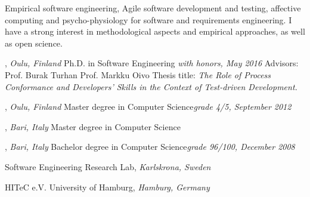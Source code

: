 \documentclass[9pt]{article}
\begin{document}
\textheight=580pt

\noindent Empirical software engineering, Agile software development and testing, affective computing and psycho-physiology for software and requirements engineering. I have a strong interest in methodological aspects and empirical approaches, as well as open science.
\bigskip
\medskip



, \emph{Oulu, Finland} \vspace{0.01in} 
\newline Ph.D. in Software Engineering {\em with honors, May 2016}
\newline Advisors: Prof. Burak Turhan \amper{} Prof. Markku Oivo
\newline Thesis title: {\em The Role of Process Conformance and Developers' Skills in the Context of Test-driven Development.}

\bigskip


, \emph{Oulu, Finland} \vspace{0.01in}  
\newline\noindent Master degree in Computer Science{\em grade 4/5, September 2012}

\bigskip

, \emph{Bari, Italy} \vspace{0.01in}  
\newline\noindent Master degree in Computer Science


\bigskip

, \emph{Bari, Italy} \vspace{0.01in}  
\newline\noindent Bachelor degree in Computer Science{\em grade 96/100, December 2008}

\bigskip
\medskip
{}

\noindent Software Engineering Research Lab, \emph{Karlskrona, Sweden} \vspace{0.01in} 
\newline{}
\bigskip

\noindent HITeC e.V. \amper{} University of Hamburg, \emph{Hamburg, Germany} \vspace{0.01in} 
\newline{}
\bigskip
\end{document}
